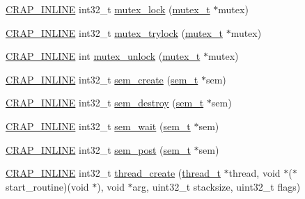 \begin{DoxyCompactItemize}
\item 
\hyperlink{config__x86_8h_a5a40526b8d842e7ff731509998bb0f1c}{C\+R\+A\+P\+\_\+\+I\+N\+L\+I\+N\+E} int32\+\_\+t \hyperlink{namespacecrap_a8a2fb199b636e39b6deb57350be943d6}{mutex\+\_\+lock} (\hyperlink{namespacecrap_a8800d1b9942594aef7c29a82865908b5}{mutex\+\_\+t} $\ast$mutex)
\item 
\hyperlink{config__x86_8h_a5a40526b8d842e7ff731509998bb0f1c}{C\+R\+A\+P\+\_\+\+I\+N\+L\+I\+N\+E} int32\+\_\+t \hyperlink{namespacecrap_ad84469a7469fb4841d2d665b489a4f5e}{mutex\+\_\+trylock} (\hyperlink{namespacecrap_a8800d1b9942594aef7c29a82865908b5}{mutex\+\_\+t} $\ast$mutex)
\item 
\hyperlink{config__x86_8h_a5a40526b8d842e7ff731509998bb0f1c}{C\+R\+A\+P\+\_\+\+I\+N\+L\+I\+N\+E} int \hyperlink{namespacecrap_ae8c0d4e1f59b088c3fd7e893a4725af4}{mutex\+\_\+unlock} (\hyperlink{namespacecrap_a8800d1b9942594aef7c29a82865908b5}{mutex\+\_\+t} $\ast$mutex)
\item 
\hyperlink{config__x86_8h_a5a40526b8d842e7ff731509998bb0f1c}{C\+R\+A\+P\+\_\+\+I\+N\+L\+I\+N\+E} int32\+\_\+t \hyperlink{namespacecrap_aa710c62b7160db283dc1daf8c410a4d4}{sem\+\_\+create} (\hyperlink{namespacecrap_a8389bdde2ea5b1b5884c12d7f82c0e39}{sem\+\_\+t} $\ast$sem)
\item 
\hyperlink{config__x86_8h_a5a40526b8d842e7ff731509998bb0f1c}{C\+R\+A\+P\+\_\+\+I\+N\+L\+I\+N\+E} int32\+\_\+t \hyperlink{namespacecrap_a2a1da4954c35039a74668b7ae723c625}{sem\+\_\+destroy} (\hyperlink{namespacecrap_a8389bdde2ea5b1b5884c12d7f82c0e39}{sem\+\_\+t} $\ast$sem)
\item 
\hyperlink{config__x86_8h_a5a40526b8d842e7ff731509998bb0f1c}{C\+R\+A\+P\+\_\+\+I\+N\+L\+I\+N\+E} int32\+\_\+t \hyperlink{namespacecrap_a6918a2c0ffe394545e72a530a3c67512}{sem\+\_\+wait} (\hyperlink{namespacecrap_a8389bdde2ea5b1b5884c12d7f82c0e39}{sem\+\_\+t} $\ast$sem)
\item 
\hyperlink{config__x86_8h_a5a40526b8d842e7ff731509998bb0f1c}{C\+R\+A\+P\+\_\+\+I\+N\+L\+I\+N\+E} int32\+\_\+t \hyperlink{namespacecrap_a24ce856f7a9604d7659975720a1ff4ba}{sem\+\_\+post} (\hyperlink{namespacecrap_a8389bdde2ea5b1b5884c12d7f82c0e39}{sem\+\_\+t} $\ast$sem)
\item 
\hyperlink{config__x86_8h_a5a40526b8d842e7ff731509998bb0f1c}{C\+R\+A\+P\+\_\+\+I\+N\+L\+I\+N\+E} int32\+\_\+t \hyperlink{namespacecrap_a72adb742e4ac563c60aa7478787a116f}{thread\+\_\+create} (\hyperlink{namespacecrap_acd6ada6ce68b7a664e02cc09a05cdeb3}{thread\+\_\+t} $\ast$thread, void $\ast$($\ast$start\+\_\+routine)(void $\ast$), void $\ast$arg, uint32\+\_\+t stacksize, uint32\+\_\+t flags)

\end{DoxyCompactItemize}
